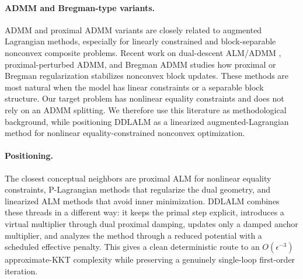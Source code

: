\paragraph{ADMM and Bregman-type variants.}
ADMM and proximal ADMM variants are closely related to augmented Lagrangian
methods, especially for linearly constrained and block-separable nonconvex
composite problems.  Recent work on dual-descent ALM/ADMM
\citep{sun2024dual_descent_alm_admm}, proximal-perturbed ADMM, and Bregman
ADMM studies how proximal or Bregman regularization stabilizes nonconvex
block updates.  These methods are most natural when the model has linear
constraints or a separable block structure.  Our target problem has nonlinear
equality constraints and does not rely on an ADMM splitting.  We therefore use
this literature as methodological background, while positioning DDLALM as a
linearized augmented-Lagrangian method for nonlinear equality-constrained
nonconvex optimization.

\paragraph{Positioning.}
The closest conceptual neighbors are proximal ALM for nonlinear equality
constraints, P-Lagrangian methods that regularize the dual geometry, and
linearized ALM methods that avoid inner minimization.  DDLALM combines these
threads in a different way: it keeps the primal step explicit, introduces a
virtual multiplier through dual proximal damping, updates only a damped
anchor multiplier, and analyzes the method through a reduced potential with a
scheduled effective penalty.  This gives a clean deterministic route to an
$O(\epsilon^{-3})$ approximate-KKT complexity while preserving a genuinely
single-loop first-order iteration.
